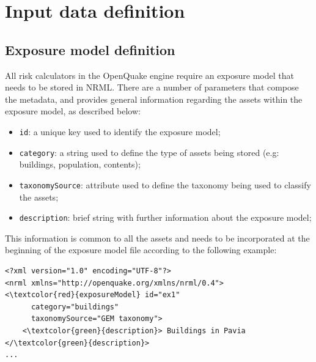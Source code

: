 \section{Input data definition}
\subsection{Exposure model definition}
All risk calculators in the OpenQuake engine require an \gls{exposure model} that needs to be stored in NRML. There are a number of parameters that compose the metadata, and provides general information regarding the \glspl{asset} within the \gls{exposure model}, as described below:

\begin{itemize}
\item  \Verb+id+: a unique key used to identify the \gls{exposure model};
\item  \Verb+category+: a string used to define the type of \glspl{asset} being stored (e.g: buildings, population, contents);
\item  \Verb+taxonomySource+: attribute used to define the \gls{taxonomy} being used to classify the  \glspl{asset};
\item  \Verb+description+: brief string with further information about the \gls{exposure model};
\end{itemize}

This information is common to all the assets and needs to be incorporated at the beginning of the exposure model file according to the following example:

\begin{Verbatim}[frame=single, commandchars=\\\{\}, samepage=false]
<?xml version="1.0" encoding="UTF-8"?>
<nrml xmlns="http://openquake.org/xmlns/nrml/0.4">
<\textcolor{red}{exposureModel} id="ex1"
      category="buildings"
      taxonomySource="GEM taxonomy">
    <\textcolor{green}{description}> Buildings in Pavia </\textcolor{green}{description}>
...
\end{Verbatim}

